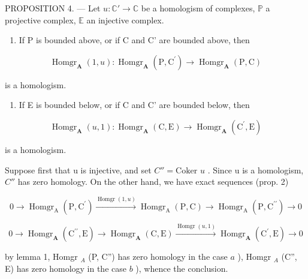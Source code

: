 PROPOSITION 4. --- Let \(u: \mathbb{C}' \to \mathbb{C}\) be a homologism of complexes, \(\mathbb{P}\) a projective complex, \(\mathbb{E}\) an injective complex.

\begin{enumerate}
\def\labelenumi{\alph{enumi})}
\tightlist
\item
  If P is bounded above, or if C and C' are bounded above, then
\end{enumerate}

\[
\operatorname{Homgr} _ {\mathbf {A}} (1, u): \operatorname{Homgr} _ {\mathbf {A}} (\mathrm{P}, \mathrm{C} ^ {\prime}) \rightarrow \operatorname{Homgr} _ {\mathbf {A}} (\mathrm{P}, \mathrm{C})
\]

is a homologism.

\begin{enumerate}
\def\labelenumi{\alph{enumi})}
\setcounter{enumi}{1}
\tightlist
\item
  If E is bounded below, or if C and C' are bounded below, then
\end{enumerate}

\[
\operatorname{Homgr} _ {\mathbf {A}} (u, 1): \operatorname{Homgr} _ {\mathbf {A}} (\mathrm{C}, \mathrm{E}) \rightarrow \operatorname{Homgr} _ {\mathbf {A}} (\mathrm{C} ^ {\prime}, \mathrm{E})
\]

is a homologism.

Suppose first that u is injective, and set \(C'' = \text{Coker } u\) . Since u is a homologism, \(C''\) has zero homology. On the other hand, we have exact sequences (prop. 2)

\[
0 \rightarrow \operatorname{Homgr} _ {\mathrm{A}} (\mathrm{P}, \mathrm{C} ^ {\prime}) \xrightarrow {\operatorname{Homgr} (1 , u)} \operatorname{Homgr} _ {\mathrm{A}} (\mathrm{P}, \mathrm{C}) \rightarrow \operatorname{Homgr} _ {\mathrm{A}} (\mathrm{P}, \mathrm{C} ^ {\prime \prime}) \rightarrow 0
\]

\[
0 \rightarrow \operatorname{Homgr} _ {\mathbf {A}} \left(\mathrm{C} ^ {\prime \prime}, \mathrm{E}\right)\rightarrow \operatorname{Homgr} _ {\mathbf {A}} (\mathrm{C}, \mathrm{E}) \xrightarrow {\operatorname{Homgr} (u , 1)} \operatorname{Homgr} _ {\mathbf {A}} \left(\mathrm{C} ^ {\prime}, \mathrm{E}\right)\rightarrow 0
\]

by lemma 1, Homgr \(_{A}\) (P, C'') has zero homology in the case \(a\) ), Homgr \(_{A}\) (C'', E) has zero homology in the case \(b\) ), whence the conclusion.

